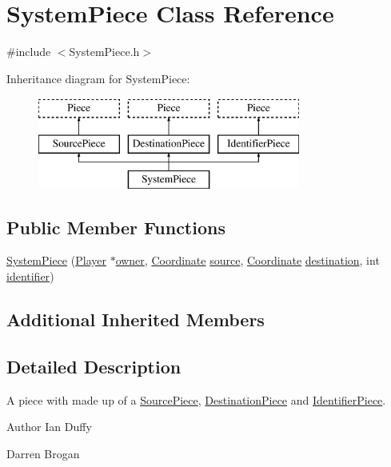 \hypertarget{classSystemPiece}{\section{System\-Piece Class Reference}
\label{classSystemPiece}
}


{\ttfamily \#include $<$System\-Piece.\-h$>$}

Inheritance diagram for System\-Piece\-:\begin{figure}[H]
\begin{center}
\leavevmode
\includegraphics[height=3.000000cm]{classSystemPiece}
\end{center}
\end{figure}
\subsection*{Public Member Functions}
\begin{DoxyCompactItemize}
\item 
\hyperlink{classSystemPiece_a5af9dda7ff0a7a5a6a0262a9d80ab956}{System\-Piece} (\hyperlink{classPlayer}{Player} $\ast$\hyperlink{classPiece_a43beac3b5268343b9f7e575d637eda98}{owner}, \hyperlink{structCoordinate}{Coordinate} \hyperlink{classSourcePiece_a9c04073192af496ceaf536dfb334a718}{source}, \hyperlink{structCoordinate}{Coordinate} \hyperlink{classDestinationPiece_acd3a864aa8c242f3b8b7d27195a2d879}{destination}, int \hyperlink{classIdentifierPiece_aab84613c911d8d7c269b9636ce6faa36}{identifier})
\end{DoxyCompactItemize}
\subsection*{Additional Inherited Members}


\subsection{Detailed Description}
A piece with made up of a \hyperlink{classSourcePiece}{Source\-Piece}, \hyperlink{classDestinationPiece}{Destination\-Piece} and \hyperlink{classIdentifierPiece}{Identifier\-Piece}. \begin{DoxyAuthor}{Author}
Ian Duffy 

Darren Brogan 
\end{DoxyAuthor}


